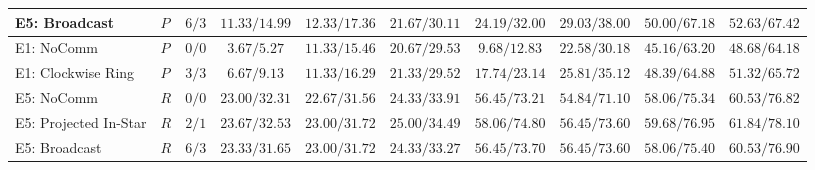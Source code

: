 \begin{table}[!t]
{\begin{tabular}{llcccccccc}
E5: Broadcast
& $P$ & $6/3$
& $11.33/14.99$ & $12.33/17.36$ & $21.67/30.11$
& $24.19/32.00$ & $29.03/38.00$ & $50.00/67.18$
& $52.63/67.42$ \\
\midrule
E1: NoComm
& $P$ & $0/0$
& $3.67/5.27$ & $11.33/15.46$ & $20.67/29.53$
& $9.68/12.83$ & $22.58/30.18$ & $45.16/63.20$
& $48.68/64.18$ \\

E1: Clockwise Ring
& $P$ & $3/3$
& $6.67/9.13$ & $11.33/16.29$ & $21.33/29.52$
& $17.74/23.14$ & $25.81/35.12$ & $48.39/64.88$
& $51.32/65.72$ \\
\midrule
E5: NoComm
& $R$ & $0/0$
& $23.00/32.31$ & $22.67/31.56$ & $24.33/33.91$
& $56.45/73.21$ & $54.84/71.10$ & $58.06/75.34$
& $60.53/76.82$ \\

E5: Projected In-Star
& $R$ & $2/1$
& $23.67/32.53$ & $23.00/31.72$ & $25.00/34.49$
& $58.06/74.80$ & $56.45/73.60$ & $59.68/76.95$
& $61.84/78.10$ \\

E5: Broadcast
& $R$ & $6/3$
& $23.33/31.65$ & $23.00/31.72$ & $24.33/33.27$
& $56.45/73.70$ & $56.45/73.60$ & $58.06/75.40$
& $60.53/76.90$ \\
\bottomrule
\end{tabular}%
}
\end{table}
